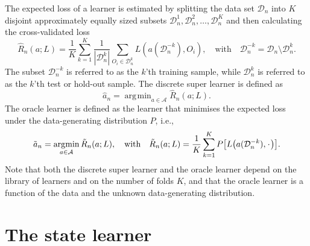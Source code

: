 \documentclass[a4paper,danish]{article}
\theoremstyle{plain} %
\numberwithin{theorem}{section}
\theoremstyle{definition} %
\theoremstyle{remark}
\newcommand{\blank}{\makebox[1ex]{\textbf{$\cdot$}}}
\newcommand{\1}{\mathds{1}}
\DeclareMathOperator*{\argmin}{\arg\!\min}
\newcommand{\empmeas}{\ensuremath{\mathbb{P}_n}} %
\newcommand{\data}{\ensuremath{\mathcal{D}}}
\begin{document}
The expected loss of a learner is estimated by splitting the data set
$\data_n$ into $K$ disjoint approximately equally sized subsets
\(\data_n^1, \data_n^2, \dots, \data_n^K \) and then calculating the
cross-validated loss
\begin{equation*}
  \hat{R}_n(a; L) =
  \frac{1}{K}\sum_{k=1}^{K}
  \frac{1}{| \data_n^{k} |}\sum_{O_i \in \data_n^{k}}
  L
  {
    \left(
      a{ (\data_n^{-k})}
      , O_i
    \right)
  },
  \quad \text{with} \quad
  \data_n^{-k} = \data_n \setminus \data_n^{k}.
\end{equation*}
The subset \(\data_n^{-k}\) is referred to as the \(k\)'th training
sample, while \(\data_n^{k}\) is referred to as the \(k\)'th test or
hold-out sample.
The discrete super learner is defined as
\begin{equation*}
\hat{a}_n = \argmin_{a\in\mathcal A}\hat{R}_n(a; L).
\end{equation*}
The oracle learner is defined as the learner that minimises the
expected loss under the data-generating distribution \( P \),
i.e.,
\begin{equation*}
  \tilde{a}_n =
  \argmin_{a \in \mathcal{A}}
  \tilde{R}_n(a; L),
  \quad \text{with} \quad 
  \tilde{R}_n(a; L)=
  \frac{1}{K}\sum_{k=1}^{K} 
  P{
    \left[
      L
      {
        \left(
          a{ (\data_n^{-k})}
          , \blank
        \right)
      }
    \right]}
  .
\end{equation*}
Note that both the discrete super learner and the oracle learner
depend on the library of learners and on the number of folds \(K\),
and that the oracle learner is a function of the data and the unknown
data-generating distribution.

\section{The state learner}
\label{sec:super-learner-simple}
\end{document}
